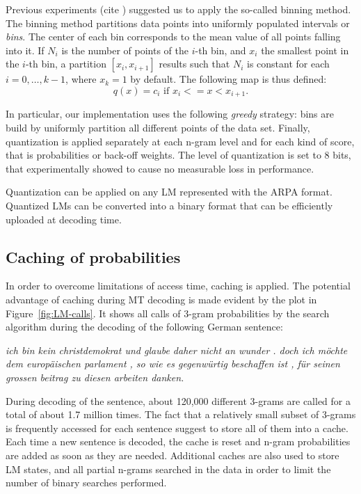 \documentclass[10pt]{report}
\theoremstyle{plain}
\begin{document}
{Previous  experiments (cite ) suggested us to apply the so-called
binning method.  The binning method partitions data points into uniformly
populated intervals or {\em bins}. The center of each bin corresponds
to the mean value of all points falling into it.  If $N_i$ is the
number of points of the $i$-th bin, and $x_i$ the smallest point in
the $i$-th bin, a partition $[x_i,x_{i+1}]$ results such that $N_i$ is
constant for each $i=0,\ldots, k-1$, where $x_k=1$ by default.
The following map is thus defined:
$$q(x)=c_i \mbox{ if } x_i<=x<x_{i+1}.$$

In particular, our implementation uses the following {\em greedy} strategy: bins are
build by uniformly partition all different points of the data set.  Finally, quantization is 
applied separately at each n-gram level and for each kind of score, that is probabilities
or back-off weights.  The level of quantization is set to 8 bits, that experimentally showed 
to cause  no measurable loss in performance.

Quantization can be applied on any LM represented with the ARPA format. Quantized LMs
can be converted into a binary format that can be efficiently uploaded at decoding time.


\subsection{Caching of probabilities}

In order to overcome limitations of access time, caching is applied. The potential advantage
of caching during MT decoding is made evident by the plot in Figure~\ref{fig:LM-calls}. 
It shows all calls of 3-gram probabilities by the search algorithm during the decoding of
the following German sentence:

{\em ich bin kein christdemokrat und glaube daher nicht an wunder . doch ich m\"ochte dem europ\"aischen parlament , so wie es gegenw\"urtig beschaffen ist , f\"ur seinen grossen beitrag zu diesen arbeiten danken.}

During decoding of the sentence, about 120,000 different 3-grams are called for a total 
of about  1.7 million times.  The fact that a relatively small subset of 3-grams is frequently
accessed for each sentence suggest to store all of them into a cache. Each time a new 
sentence is decoded, the cache is reset and n-gram probabilities are added as soon as they are 
needed.  Additional caches are also used to store LM states, and all partial  n-grams 
searched in the data in order to limit the number of binary searches performed.

}
\end{document}
